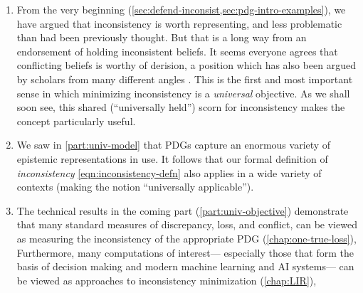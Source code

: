 \begin{enumerate}
\item
From the very beginning (\cref{sec:defend-inconsist,sec:pdg-intro-examples}), we have argued that inconsistency is worth representing, 
    and less problematic than had been previously thought.
But that is a long way from an endorsement of holding inconsistent beliefs.
%
It seems everyone agrees that conflicting beliefs is worthy of derision,
    a position which has also been argued by scholars from many different angles 
\citep{descartes,sep-dutch-book,finocchiaro1981fallacies,%
    why-be-consistent-sugden}. 
This is the first and most important
    sense in which minimizing inconsistency is a \emph{universal} objective. 
As we shall soon see, 
this shared (``universally held'') scorn for inconsistency makes the concept
    particularly useful.


\item
We saw in \cref{part:univ-model} that PDGs capture an enormous variety of epistemic representations in use.
It follows that our formal definition of \emph{inconsistency} \cref{eqn:inconsistency-defn} also applies in a wide variety of contexts
    (making the notion ``universally applicable'').

\item
The technical results in the coming part (\cref{part:univ-objective}) demonstrate that
many standard measures of discrepancy, loss, and conflict, can be viewed as measuring the inconsistency of the appropriate PDG (\cref{chap:one-true-loss}), 
%
Furthermore, many computations of interest---%
especially those that form the basis of decision making and modern machine learning and AI systems---%
can be viewed as approaches to inconsistency minimization
    (\cref{chap:LIR}),
%



\end{enumerate}
